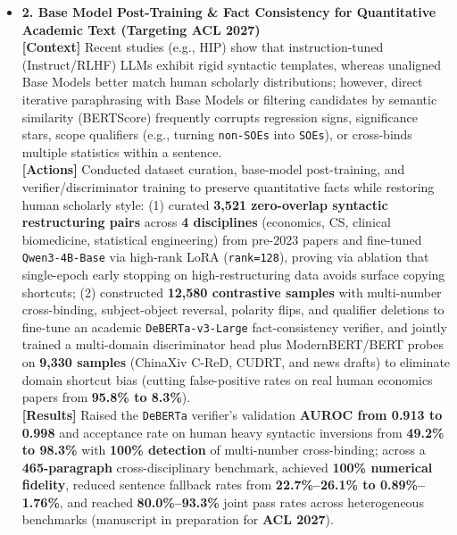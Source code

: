 \documentclass[10pt,letterpaper]{article}
\begin{document}
\begin{itemize}[leftmargin=0pt,label={}]
\begin{itemize}[leftmargin=10pt,label=$\circ$,itemsep=2.5pt,topsep=1.5pt]
    \item \textbf{2. Base Model Post-Training \& Fact Consistency for Quantitative Academic Text (Targeting ACL 2027)} \\
    \textbf{[Context]} Recent studies (e.g., HIP) show that instruction-tuned (Instruct/RLHF) LLMs exhibit rigid syntactic templates, whereas unaligned Base Models better match human scholarly distributions; however, direct iterative paraphrasing with Base Models or filtering candidates by semantic similarity (BERTScore) frequently corrupts regression signs, significance stars, scope qualifiers (e.g., turning \texttt{non-SOEs} into \texttt{SOEs}), or cross-binds multiple statistics within a sentence. \\
    \textbf{[Actions]} Conducted dataset curation, base-model post-training, and verifier/discriminator training to preserve quantitative facts while restoring human scholarly style: (1) curated \textbf{3,521 zero-overlap syntactic restructuring pairs} across \textbf{4 disciplines} (economics, CS, clinical biomedicine, statistical engineering) from pre-2023 papers and fine-tuned \texttt{Qwen3-4B-Base} via high-rank LoRA (\texttt{rank=128}), proving via ablation that single-epoch early stopping on high-restructuring data avoids surface copying shortcuts; (2) constructed \textbf{12,580 contrastive samples} with multi-number cross-binding, subject-object reversal, polarity flips, and qualifier deletions to fine-tune an academic \texttt{DeBERTa-v3-Large} fact-consistency verifier, and jointly trained a multi-domain discriminator head plus ModernBERT/BERT probes on \textbf{9,330 samples} (ChinaXiv C-ReD, CUDRT, and news drafts) to eliminate domain shortcut bias (cutting false-positive rates on real human economics papers from \textbf{95.8\% to 8.3\%}). \\
    \textbf{[Results]} Raised the \texttt{DeBERTa} verifier's validation \textbf{AUROC from 0.913 to 0.998} and acceptance rate on human heavy syntactic inversions from \textbf{49.2\% to 98.3\%} with \textbf{100\% detection} of multi-number cross-binding; across a \textbf{465-paragraph} cross-disciplinary benchmark, achieved \textbf{100\% numerical fidelity}, reduced sentence fallback rates from \textbf{22.7\%--26.1\% to 0.89\%--1.76\%}, and reached \textbf{80.0\%--93.3\%} joint pass rates across heterogeneous benchmarks (manuscript in preparation for \textbf{ACL 2027}).
  \end{itemize}
\end{itemize}

\end{document}
